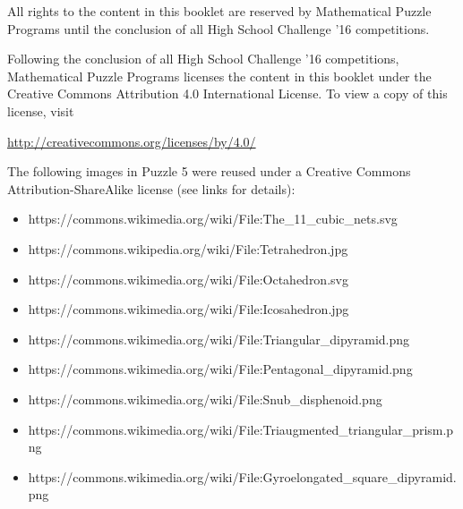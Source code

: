 \begin{licensing}
  All rights to the content in this booklet are reserved by Mathematical
  Puzzle Programs until the conclusion
  of all High School Challenge '16 competitions.

  Following the conclusion of all High School Challenge '16 competitions,
  Mathematical Puzzle Programs licenses the content in this booklet
  under the Creative Commons Attribution 4.0
  International License. To view a copy of this license, visit

  \begin{center}
    \url{http://creativecommons.org/licenses/by/4.0/}
  \end{center}

  \vspace{2em}

  \noindent
  The following images in Puzzle 5 were reused under a
  Creative Commons Attribution-ShareAlike license (see links for details):
  \begin{itemize}
    \item https://commons.wikimedia.org/wiki/File:The\_11\_cubic\_nets.svg
    \item https://commons.wikipedia.org/wiki/File:Tetrahedron.jpg
    \item https://commons.wikimedia.org/wiki/File:Octahedron.svg
    \item https://commons.wikimedia.org/wiki/File:Icosahedron.jpg
    \item https://commons.wikimedia.org/wiki/File:Triangular\_dipyramid.png
    \item https://commons.wikimedia.org/wiki/File:Pentagonal\_dipyramid.png
    \item https://commons.wikimedia.org/wiki/File:Snub\_disphenoid.png
    \item https://commons.wikimedia.org/wiki/File:Triaugmented\_triangular\_prism.png
    \item https://commons.wikimedia.org/wiki/File:Gyroelongated\_square\_dipyramid.png
  \end{itemize}
\end{licensing}
